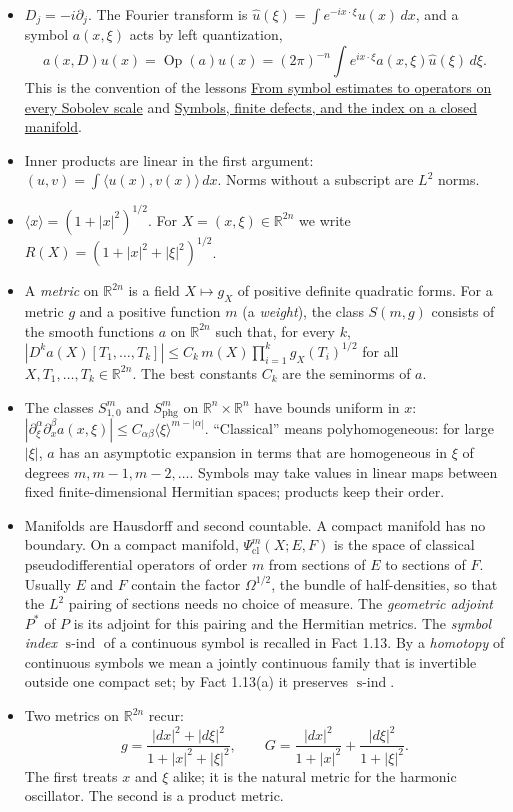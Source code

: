 \documentclass[
  11pt,
]{article}
\providecommand{\tightlist}{%
  \setlength{\itemsep}{0pt}\setlength{\parskip}{0pt}}
\begin{document}
\begin{itemize}
\tightlist
\item
  \(D_j=-i\partial_j\). The Fourier transform is
  \(\widehat u(\xi)=\int e^{-ix\cdot\xi}u(x)\,dx\), and a symbol
  \(a(x,\xi)\) acts by left quantization, \[
a(x,D)u(x)=\operatorname{Op}(a)u(x)=(2\pi)^{-n}\int e^{ix\cdot\xi}a(x,\xi)\widehat u(\xi)\,d\xi .
\] This is the convention of the lessons
  \href{euclidean-symbol-calculus.pdf}{From symbol estimates to operators
  on every Sobolev scale} and
  \href{global-elliptic-symbol-index.pdf}{Symbols, finite defects, and
  the index on a closed manifold}.
\item
  Inner products are linear in the first argument:
  \((u,v)=\int\langle u(x),v(x)\rangle\,dx\). Norms without a subscript
  are \(L^2\) norms.
\item
  \(\langle x\rangle=(1+|x|^2)^{1/2}\). For
  \(X=(x,\xi)\in\mathbb R^{2n}\) we write
  \(R(X)=(1+|x|^2+|\xi|^2)^{1/2}\).
\item
  A \emph{metric} on \(\mathbb R^{2n}\) is a field \(X\mapsto g_X\) of
  positive definite quadratic forms. For a metric \(g\) and a positive
  function \(m\) (a \emph{weight}), the class \(S(m,g)\) consists of the
  smooth functions \(a\) on \(\mathbb R^{2n}\) such that, for every
  \(k\),
  \(|D^ka(X)[T_1,\dots,T_k]|\le C_k\,m(X)\prod_{i=1}^kg_X(T_i)^{1/2}\)
  for all \(X,T_1,\dots,T_k\in\mathbb R^{2n}\). The best constants
  \(C_k\) are the seminorms of \(a\).
\item
  The classes \(S^m_{1,0}\) and \(S^m_{\mathrm{phg}}\) on
  \(\mathbb R^n\times\mathbb R^n\) have bounds uniform in \(x\):
  \(|\partial_\xi^\alpha\partial_x^\beta a(x,\xi)|\le C_{\alpha\beta}\langle\xi\rangle^{m-|\alpha|}\).
  ``Classical'' means polyhomogeneous: for large \(|\xi|\), \(a\) has an
  asymptotic expansion in terms that are homogeneous in \(\xi\) of
  degrees \(m,m-1,m-2,\dots\). Symbols may take values in linear maps
  between fixed finite-dimensional Hermitian spaces; products keep their
  order.
\item
  Manifolds are Hausdorff and second countable. A compact manifold has
  no boundary. On a compact manifold, \(\Psi^m_{\mathrm{cl}}(X;E,F)\) is
  the space of classical pseudodifferential operators of order \(m\)
  from sections of \(E\) to sections of \(F\). Usually \(E\) and \(F\)
  contain the factor \(\Omega^{1/2}\), the bundle of half-densities, so
  that the \(L^2\) pairing of sections needs no choice of measure. The
  \emph{geometric adjoint} \(P^*\) of \(P\) is its adjoint for this
  pairing and the Hermitian metrics. The \emph{symbol index}
  \(\operatorname{s-ind}\) of a continuous symbol is recalled in Fact
  1.13. By a \emph{homotopy} of continuous symbols we mean a jointly
  continuous family that is invertible outside one compact set; by Fact
  1.13(a) it preserves \(\operatorname{s-ind}\).
\item
  Two metrics on \(\mathbb R^{2n}\) recur: \[
g=\frac{|dx|^2+|d\xi|^2}{1+|x|^2+|\xi|^2},\qquad
G=\frac{|dx|^2}{1+|x|^2}+\frac{|d\xi|^2}{1+|\xi|^2}.
\tag{1.1}
\] The first treats \(x\) and \(\xi\) alike; it is the natural metric
  for the harmonic oscillator. The second is a product metric.
\end{itemize}
\end{document}
